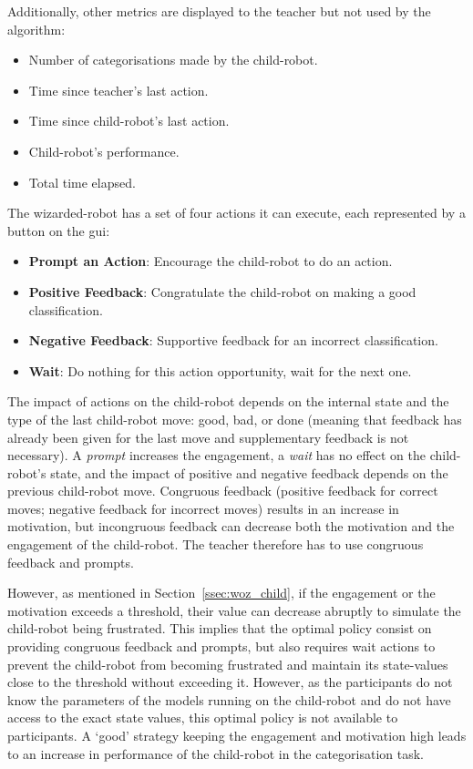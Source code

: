 Additionally, other metrics are displayed to the teacher but not used by the algorithm:
\begin{itemize}
	\item Number of categorisations made by the child-robot.
	\item Time since teacher's last action.
	\item Time since child-robot's last action.
	\item Child-robot's performance.
	\item Total time elapsed.
\end{itemize}


The wizarded-robot has a set of four actions it can execute, each represented by a button on the \gls{gui}: 
\begin{itemize}
	\item \textbf{Prompt an Action}: Encourage the child-robot to do an action.
	\item \textbf{Positive Feedback}: Congratulate the child-robot on making a good classification.
	\item \textbf{Negative Feedback}: Supportive feedback for an incorrect classification.
	\item \textbf{Wait}: Do nothing for this action opportunity, wait for the next one.
\end{itemize}


The impact of actions on the child-robot depends on the internal state and the type of the last child-robot move: good, bad, or done (meaning that feedback has already been given for the last move and supplementary feedback is not necessary). A \textit{prompt} increases the engagement, a \textit{wait} has no effect on the child-robot's state, and the impact of positive and negative feedback depends on the previous child-robot move. Congruous feedback (positive feedback for correct moves; negative feedback for incorrect moves) results in an increase in motivation, but incongruous feedback can decrease both the motivation and the engagement of the child-robot. The teacher therefore has to use congruous feedback and prompts.

However, as mentioned in Section~\ref{ssec:woz_child}, if the engagement or the motivation exceeds a threshold, their value can decrease abruptly to simulate the child-robot being frustrated. This implies that the optimal policy consist on providing congruous feedback and prompts, but also requires wait actions to prevent the child-robot from becoming frustrated and maintain its state-values close to the threshold without exceeding it. However, as the participants do not know the parameters of the models running on the child-robot and do not have access to the exact state values, this optimal policy is not available to participants. A `good' strategy keeping the engagement and motivation high leads to an increase in performance of the child-robot in the categorisation task.

